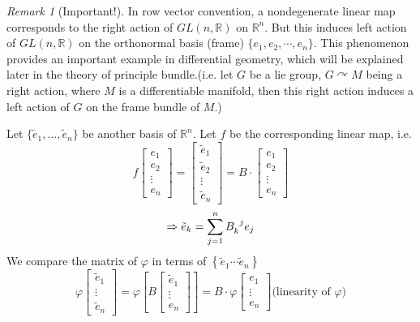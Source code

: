 \documentclass[UTF8,oneside,11pt]{book}
\theoremstyle{plain}\newtheorem{thm}{Theorem}
\theoremstyle{definition}\newtheorem{defn}[thm]{Definition}
\theoremstyle{plain}\newtheorem{axiom}[thm]{Axiom}
\theoremstyle{plain}\newtheorem{coro}[thm]{Corollary}
\theoremstyle{plain}\newtheorem{lemma}[thm]{Lemma}
\theoremstyle{plain}\newtheorem{prop}[thm]{Proposition}
\theoremstyle{plain}\newtheorem{conj}[thm]{Conjecture}
\theoremstyle{plain}\newtheorem{ques}[thm]{Problem}
\theoremstyle{plain}\newtheorem{const}[thm]{Construction}
\theoremstyle{remark}\newtheorem{notation}[thm]{Notation}
\theoremstyle{plain}\newtheorem*{app}{Application}
\theoremstyle{plain}\newtheorem*{exam}{Example}
\theoremstyle{plain}\newtheorem*{exer}{Exercise}
\theoremstyle{remark}\newtheorem*{remark}{Remark}
\theoremstyle{remark}\newtheorem*{note}{\small{Note}}
\numberwithin{equation}{section}
\numberwithin{thm}{section}
\begin{document}
\begin{remark}[Important!]
    In row vector convention, a nondegenerate linear map corresponds to the right action of $GL(n,\mathbb{R})$ on $\mathbb{R}^n$. But this induces left action of $GL(n,\mathbb{R})$ on the orthonormal basis (frame) $\{e_1,e_2,\cdots,e_n\}$. This phenomenon provides an important example in differential geometry, which will be explained later in the theory of principle bundle.(i.e. let $G$ be a lie group, $G\curvearrowright M$ being a right action, where $M$ is a differentiable manifold, then this right action induces a left action of $G$ on the frame bundle of $M$.)
 \end{remark}
 
 
 Let $\{\tilde{e}_1,\ldots,\tilde{e}_n\}$ be another basis of $\mathbb{R}^n$. Let $f$ be the corresponding linear map, i.e.
 \[f\begin{bmatrix}
    e_1\\
    e_2\\
    \vdots\\
    e_n
\end{bmatrix}=\begin{bmatrix}
    \tilde{e}_1\\
    \tilde{e}_2\\
    \vdots\\
    \tilde{e}_n
\end{bmatrix}=B \cdot \begin{bmatrix}
    e_1\\
    e_2\\
    \vdots\\
    e_n
\end{bmatrix}\]
\[\Rightarrow \tilde{e}_k=\sum_{j=1}^n B\indices{_k^j}e_j\]
We compare the matrix of $\varphi$ in terms of $\left\{\tilde{e}_1 \cdots \tilde{e}_n\right\}$
\[
    \varphi\left[\begin{array}{c}\tilde{e}_1 \\ \vdots \\ \tilde{e}_n\end{array}\right]=\varphi\left[B\left[\begin{array}{c}\tilde{e}_1 \\ \vdots \\ e_n\end{array}\right]\right]=B \cdot \varphi\left[\begin{array}{c}e_1 \\ \vdots \\ e_n\end{array}\right]\text{(linearity of }\varphi\text{)}
\]
\end{document}
